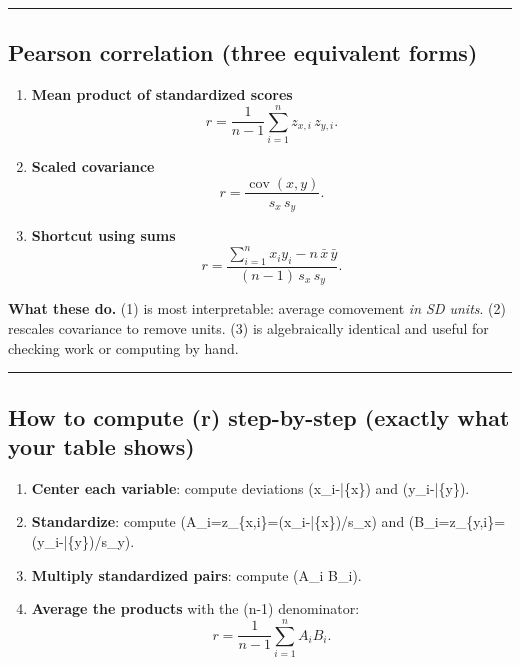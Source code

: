 \documentclass[
  letterpaper,
  DIV=11,
  numbers=noendperiod]{scrreprt}
\providecommand{\tightlist}{%
  \setlength{\itemsep}{0pt}\setlength{\parskip}{0pt}}
\begin{document}
\begin{center}\rule{0.5\linewidth}{0.5pt}\end{center}

\subsection{Pearson correlation (three equivalent
forms)}\label{pearson-correlation-three-equivalent-forms}

\begin{enumerate}
\def\labelenumi{\arabic{enumi})}
\item
  \textbf{Mean product of standardized scores} \[
  r=\frac{1}{n-1}\sum_{i=1}^n z_{x,i}\,z_{y,i}.
  \]
\item
  \textbf{Scaled covariance} \[
  r=\frac{\operatorname{cov}(x,y)}{s_x\,s_y}.
  \]
\item
  \textbf{Shortcut using sums} \[
  r=\frac{\sum_{i=1}^n x_i y_i - n\,\bar{x}\,\bar{y}}
  {(n-1)\,s_x\,s_y}.
  \]
\end{enumerate}

\textbf{What these do.} (1) is most interpretable: average comovement
\emph{in SD units}. (2) rescales covariance to remove units. (3) is
algebraically identical and useful for checking work or computing by
hand.

\begin{center}\rule{0.5\linewidth}{0.5pt}\end{center}

\subsection{How to compute (r) step-by-step (exactly what your table
shows)}\label{how-to-compute-r-step-by-step-exactly-what-your-table-shows}

\begin{enumerate}
\def\labelenumi{\arabic{enumi}.}
\tightlist
\item
  \textbf{Center each variable}: compute deviations (x\_i-\bar\{x\}) and
  (y\_i-\bar\{y\}).
\item
  \textbf{Standardize}: compute (A\_i=z\_\{x,i\}=(x\_i-\bar\{x\})/s\_x)
  and (B\_i=z\_\{y,i\}=(y\_i-\bar\{y\})/s\_y).
\item
  \textbf{Multiply standardized pairs}: compute (A\_i B\_i).
\item
  \textbf{Average the products} with the (n-1) denominator: \[
  r=\frac{1}{n-1}\sum_{i=1}^n A_i B_i.
  \]
\end{enumerate}
\end{document}
